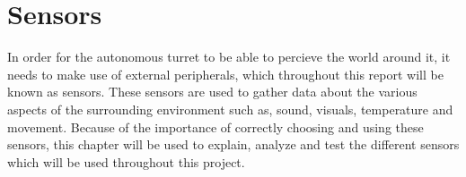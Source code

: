 \chapter{Sensors}\label{sensors}
In order for the autonomous turret to be able to percieve the world around it,
it needs to make use of external peripherals, which throughout this report will
be known as sensors. These sensors are used to gather data about the various
aspects of the surrounding environment such as, sound, visuals, temperature and
movement. Because of the importance of correctly choosing and using these
sensors, this chapter will be used to explain, analyze and test the different
sensors which will be used throughout this project.

 


% 
% 
% 
% 